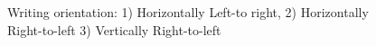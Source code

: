   \begin{figure}[H]
    \centering
    \caption{Writing orientation: 1) Horizontally Left-to right, 2) Horizontally Right-to-left 3) Vertically Right-to-left}
  \end{figure}

